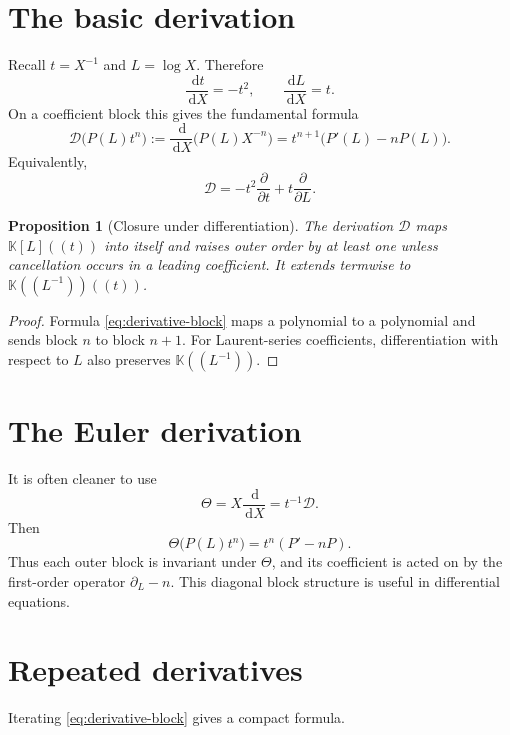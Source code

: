 \documentclass[11pt,oneside]{book}
\newtheorem{proposition}[theorem]{Proposition}
\theoremstyle{definition}
\theoremstyle{remark}
\newcommand{\K}{\mathbb K}
\newcommand{\dd}{\,\mathrm d}
\newcommand{\D}{\mathcal D}
\newcommand{\Thetaop}{\Theta}
\begin{document}
\section{The basic derivation}
Recall $t=X^{-1}$ and $L=\log X$.  Therefore
\[
 \frac{\dd t}{\dd X}=-t^2,
 \qquad
 \frac{\dd L}{\dd X}=t.
\]
On a coefficient block this gives the fundamental formula
\begin{equation}\label{eq:derivative-block}
 \D\bigl(P(L)t^n\bigr)
 :=\frac{\dd}{\dd X}\bigl(P(L)X^{-n}\bigr)
 =t^{n+1}\bigl(P'(L)-nP(L)\bigr).
\end{equation}
Equivalently,
\begin{equation}\label{eq:derivation-operator}
 \D=-t^2\frac{\partial}{\partial t}
     +t\frac{\partial}{\partial L}.
\end{equation}

\begin{proposition}[Closure under differentiation]
The derivation $\D$ maps $\K[L]((t))$ into itself and raises outer order by at
least one unless cancellation occurs in a leading coefficient.  It extends
termwise to $\K((L^{-1}))((t))$.
\end{proposition}
\begin{proof}
Formula \eqref{eq:derivative-block} maps a polynomial to a polynomial and
sends block $n$ to block $n+1$.  For Laurent-series coefficients,
differentiation with respect to $L$ also preserves $\K((L^{-1}))$.
\end{proof}

\section{The Euler derivation}
It is often cleaner to use
\begin{equation}\label{eq:euler-derivation}
 \Thetaop=X\frac{\dd}{\dd X}=t^{-1}\D.
\end{equation}
Then
\begin{equation}\label{eq:euler-block}
 \Thetaop\bigl(P(L)t^n\bigr)=t^n(P'-nP).
\end{equation}
Thus each outer block is invariant under $\Thetaop$, and its coefficient is
acted on by the first-order operator $\partial_L-n$.  This diagonal block
structure is useful in differential equations.

\section{Repeated derivatives}
Iterating \eqref{eq:derivative-block} gives a compact formula.
\end{document}
